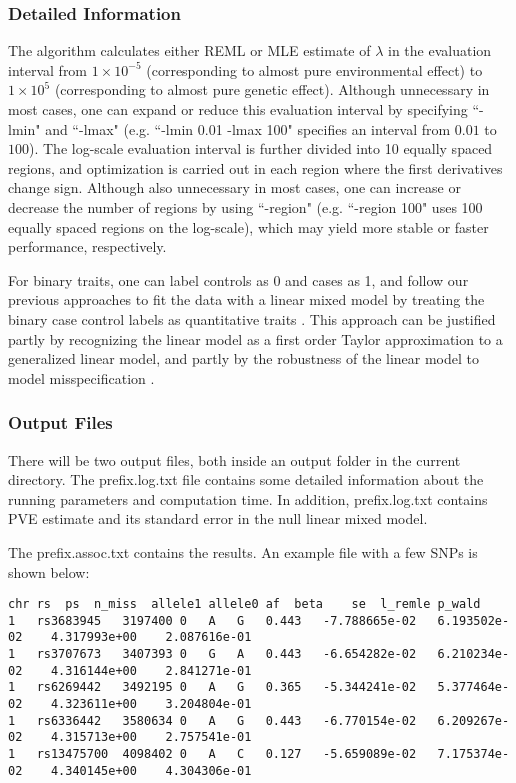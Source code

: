 \documentclass[11pt]{article}
\begin{document}
\subsubsection{Detailed Information}
The algorithm calculates either REML or MLE estimate of $\lambda$ in the evaluation interval from $1\times 10^{-5}$ (corresponding to almost pure environmental effect) to $1\times 10^5$ (corresponding to almost pure genetic effect). Although unnecessary in most cases, one can expand or reduce this evaluation interval by specifying ``-lmin" and ``-lmax" (e.g. ``-lmin 0.01 -lmax 100" specifies an interval from $0.01$ to $100$). The log-scale evaluation interval is further divided into 10 equally spaced regions, and optimization is carried out in each region where the first derivatives change sign. Although also unnecessary in most cases, one can increase or decrease the number of regions by using ``-region" (e.g. ``-region 100" uses 100 equally spaced regions on the log-scale), which may yield more stable or faster performance, respectively.

For binary traits, one can label controls as 0 and cases as 1, and follow our previous approaches to fit the data with a linear mixed model by treating the binary case control labels as quantitative traits \cite{Zhou:2012, Zhou:2013}. This approach can be justified partly by recognizing the linear model as a first order Taylor approximation to a generalized linear model, and partly by the robustness of the linear model to model misspecification \cite{Zhou:2013}.


\subsubsection{Output Files}
There will be two output files, both inside an output folder in the current directory. The prefix.log.txt file contains some detailed information about the running parameters and computation time. In addition, prefix.log.txt contains PVE estimate and its standard error in the null linear mixed model.

The prefix.assoc.txt contains the results. An example file with a few SNPs is shown below:
%
\begin{verbatim}
chr	rs	ps	n_miss	allele1	allele0	af	beta	se	l_remle	p_wald
1	rs3683945	3197400	0	A	G	0.443	-7.788665e-02	6.193502e-02	4.317993e+00	2.087616e-01
1	rs3707673	3407393	0	G	A	0.443	-6.654282e-02	6.210234e-02	4.316144e+00	2.841271e-01
1	rs6269442	3492195	0	A	G	0.365	-5.344241e-02	5.377464e-02	4.323611e+00	3.204804e-01
1	rs6336442	3580634	0	A	G	0.443	-6.770154e-02	6.209267e-02	4.315713e+00	2.757541e-01
1	rs13475700	4098402	0	A	C	0.127	-5.659089e-02	7.175374e-02	4.340145e+00	4.304306e-01
\end{verbatim}
%
\end{document}
